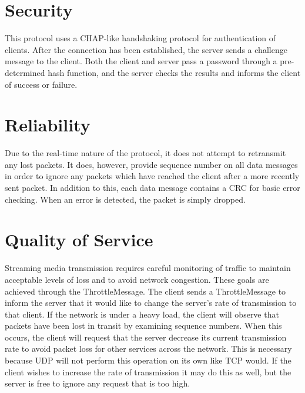 \documentclass[12pt,letterpaper,titlepage]{article}
\begin{document}
\section{Security}
This protocol uses a CHAP-like handshaking protocol for authentication of clients.  After the connection has been established, the server sends a challenge message to the client.  Both the client and server pass a password through a pre-determined hash function, and the server checks the results and informs the client of success or failure.

\section{Reliability}
Due to the real-time nature of the protocol, it does not attempt to retransmit any lost packets. It does, however, provide sequence number on all data messages in order to ignore any packets which have reached the client after a more recently sent packet. In addition to this, each data message contains a CRC for basic error checking. When an error is detected, the packet is simply dropped.

\section{Quality of Service}
Streaming media transmission requires careful monitoring of traffic to maintain acceptable levels of loss and to avoid network congestion. These goals are achieved through the ThrottleMessage. The client sends a ThrottleMessage to inform the server that it would like to change the server's rate of transmission to that client. If the network is under a heavy load, the client will observe that packets have been lost in transit by examining sequence numbers. When this occurs, the client will request that the server decrease its current transmission rate to avoid packet loss for other services across the network. This is necessary because UDP will not perform this operation on its own like TCP would. If the client wishes to increase the rate of transmission it may do this as well, but the server is free to ignore any request that is too high.
\end{document}
